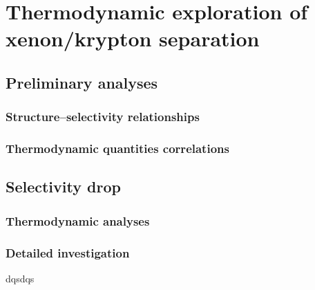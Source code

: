 \documentclass[main]{subfiles}
\begin{document}
\chapter{Thermodynamic exploration of xenon/krypton separation}
\vspace*{-1\baselineskip}
\section{Preliminary analyses}

\subsection{Structure--selectivity relationships}

\subsection{Thermodynamic quantities correlations}

\section{Selectivity drop}

\subsection{Thermodynamic analyses}

\subsection{Detailed investigation}
dqsdqs
\OnlyInSubfile{\printglobalbibliography}
\end{document}
